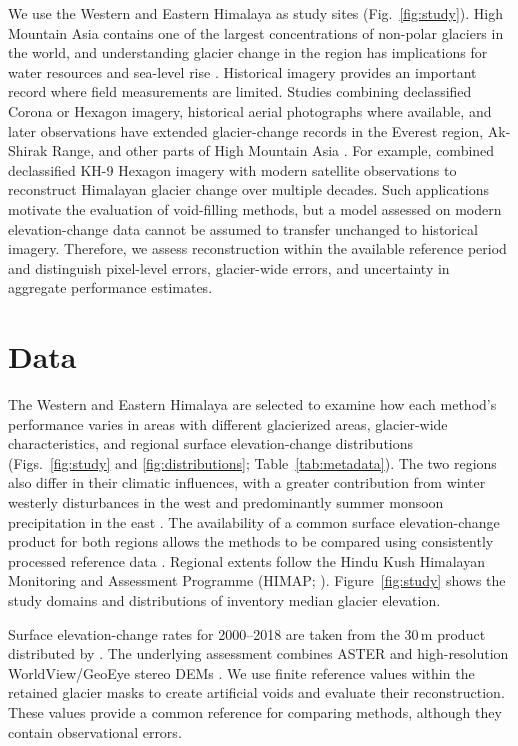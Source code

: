 \documentclass[tc,manuscript]{copernicus}
\begin{document}
We use the Western and Eastern Himalaya as study sites (Fig.~\ref{fig:study}). High Mountain Asia contains one of the largest concentrations of non-polar glaciers in the world, and understanding glacier change in the region has implications for water resources and sea-level rise \citep{bolch2019, shean2020}. Historical imagery provides an important record where field measurements are limited. Studies combining declassified Corona or Hexagon imagery, historical aerial photographs where available, and later observations have extended glacier-change records in the Everest region, Ak-Shirak Range, and other parts of High Mountain Asia \citep{bolch2011,goerlich2017,king2020,bhattacharya2021}. For example, \citet{maurer2019} combined declassified KH-9 Hexagon imagery with modern satellite observations to reconstruct Himalayan glacier change over multiple decades. Such applications motivate the evaluation of void-filling methods, but a model assessed on modern elevation-change data cannot be assumed to transfer unchanged to historical imagery. Therefore, we assess reconstruction within the available reference period and distinguish pixel-level errors, glacier-wide errors, and uncertainty in aggregate performance estimates.


\FloatBarrier

\section{Data}
The Western and Eastern Himalaya are selected to examine how each method's performance varies in areas with different glacierized areas, glacier-wide characteristics, and regional surface elevation-change distributions (Figs.~\ref{fig:study} and \ref{fig:distributions}; Table~\ref{tab:metadata}). The two regions also differ in their climatic influences, with a greater contribution from winter westerly disturbances in the west and predominantly summer monsoon precipitation in the east \citep{bolch2019}. The availability of a common surface elevation-change product for both regions allows the methods to be compared using consistently processed reference data \citep{shean2020}. Regional extents follow the Hindu Kush Himalayan Monitoring and Assessment Programme (HIMAP; \citealp{bolch2019}). Figure~\ref{fig:study} shows the study domains and distributions of inventory median glacier elevation.

Surface elevation-change rates for 2000--2018 are taken from the 30\,m product distributed by \citet{sheands2020}. The underlying assessment combines ASTER and high-resolution WorldView/GeoEye stereo DEMs \citep{shean2020}. We use finite reference values within the retained glacier masks to create artificial voids and evaluate their reconstruction. These values provide a common reference for comparing methods, although they contain observational errors.
\end{document}
